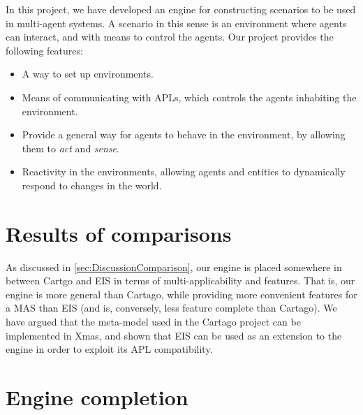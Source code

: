 In this project, we have developed an engine for constructing scenarios
to be used in multi-agent systems. A scenario in this sense is an
environment where agents can interact, and with means to control the
agents. Our project provides the following features:
\begin{itemize}
\item A way to set up environments.
\item Means of communicating with APLs, which controls the agents inhabiting
the environment.
\item Provide a general way for agents to behave in the environment, by
allowing them to \emph{act} and \emph{sense}.
\item Reactivity in the environments, allowing agents and entities to dynamically
respond to changes in the world.
\end{itemize}

\section{Results of comparisons}

As discussed in \ref{sec:DiscussionComparison}, our engine is placed
somewhere in between Cartgo and EIS in terms of multi-applicability
and features. That is, our engine is more general than Cartago, while
providing more convenient features for a MAS than EIS (and is, conversely,
less feature complete than Cartago). We have argued that the meta-model
used in the Cartago project can be implemented in Xmas, and shown
that EIS can be used as an extension to the engine in order to exploit
its APL compatibility.


\section{Engine completion}

